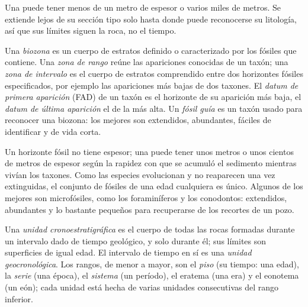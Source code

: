 Una  puede tener menos de un metro de espesor o varios miles de metros. Se extiende lejos de su sección tipo solo hasta donde puede reconocerse su litología, así que sus límites siguen la roca, no el tiempo.

\begin{definition}\label{def:b1:stratigraphic-scale:biozone}
Una \emph{biozona} es un cuerpo de estratos definido o caracterizado por los fósiles que contiene. Una \emph{zona de rango} reúne las apariciones conocidas de un taxón;
una \emph{zona de intervalo} es el cuerpo de estratos comprendido entre dos horizontes fósiles especificados, por ejemplo las apariciones más bajas de dos taxones. El \emph{datum de primera aparición}
(FAD) de un taxón es el horizonte de su aparición más baja, el \emph{datum de última aparición} el de la más alta. Un \emph{fósil guía} es un taxón usado para
reconocer una biozona: los mejores son extendidos, abundantes, fáciles de identificar y de vida corta.
\end{definition}

Un horizonte fósil no tiene espesor; una  puede tener unos metros o unos cientos de metros de espesor según la rapidez con que se acumuló el sedimento mientras vivían los taxones. Como las especies evolucionan
y no reaparecen una vez extinguidas, el conjunto de fósiles de una edad cualquiera es único. Algunos de los mejores  son microfósiles, como los foraminíferos y los conodontos: extendidos, abundantes y lo bastante pequeños
para recuperarse de los recortes de un pozo.

\begin{definition}\label{def:b1:stratigraphic-scale:chronostratigraphy}
Una \emph{unidad cronoestratigráfica} es el cuerpo de todas las rocas formadas durante un intervalo dado de tiempo geológico, y solo durante él; sus límites son superficies de igual edad.
El intervalo de tiempo en sí es una \emph{unidad geocronológica}. Los rangos, de menor a mayor, son el \emph{piso} (su tiempo: una edad), la \emph{serie}
(una época), el \emph{sistema} (un período), el eratema (una era) y el eonotema (un eón); cada unidad está hecha de varias unidades consecutivas del rango inferior.
\end{definition}

